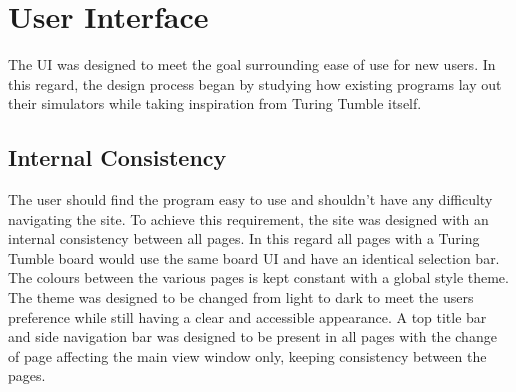 \documentclass{l4proj}
\begin{document}


\section{User Interface}

The UI was designed to meet the goal surrounding ease of use for new users. In this regard, the design process began by studying how existing programs lay out their simulators while taking inspiration from Turing Tumble itself.

\subsection{Internal Consistency}
The user should find the program easy to use and shouldn't have any difficulty navigating the site. To achieve this requirement, the site was designed with an internal consistency between all pages. In this regard all pages with a Turing Tumble board would use the same board UI and have an identical selection bar. The colours between the various pages is kept constant with a global style theme. The theme was designed to be changed from light to dark to meet the users preference while still having a clear and accessible appearance. A top title bar and side navigation bar was designed to be present in all pages with the change of page affecting the main view window only, keeping consistency between the pages.
\end{document}
